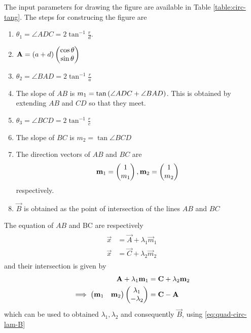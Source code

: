 \documentclass[journal,12pt,twocolumn]{IEEEtran}
\begin{document}
\begin{enumerate}
\begin{figure}
	  \caption{}
	  \label{fig:matrix-10-14.pdf}
	  \end{figure}
	    \solution   The input parameters for drawing the figure are available in Table
\eqref{table:circ-tang}.  The steps for construcing the figure are 
\begin{enumerate}
	\item  $\theta_1 = \angle ADC = 2\tan ^{-1}\frac{r}{d}$. 
	\item $\mathbf{A} = \left(a+ d\right) \begin{pmatrix}\cos \theta \\ \sin \theta\end{pmatrix}$
	\item $\theta_2 = \angle BAD = 2 \tan ^{-1}\frac{r}{a}$
	\item The slope of $AB$ is $m_1 =   \tan\left(\angle ADC + \angle BAD\right)$.  This is obtained by extending $AB$ and $CD$ so that they meet.
	\item $\theta_3 = \angle BCD = 2 \tan^{-1}\frac{r}{c}$
	\item The slope of $BC$ is $m_2 = \tan \angle BCD$
	\item The direction vectors of $AB$ and $BC$ are
		\begin{align}
			\mathbf{m}_1 = \begin{pmatrix}1 \\m_1\end{pmatrix},
			\mathbf{m}_2 = \begin{pmatrix}1 \\m_2\end{pmatrix}
		\end{align}
		respectively.
	\item $\vec{B}$ is obtained as the point of intersection of the lines $AB$ and $BC$
\end{enumerate}
The equation of $AB$ and BC are respectively 
\begin{align}
	\begin{split}
	\vec{x} &= \vec{A} + \lambda_1 \vec{m}_1
\\
		\vec{x} &= \vec{C} + \lambda_2 \vec{m}_2
		\label{eq:quad-circ-lam-B}
	\end{split}
\end{align}
and their intersection is given by 
\begin{align}
	 \mathbf{A} + \lambda_1 \mathbf{m}_1
	&	= \mathbf{C} + \lambda_2 \mathbf{m}_2
	\\
	\implies \begin{pmatrix}\mathbf{m}_1 & \mathbf{m}_2\end{pmatrix}\begin{pmatrix}\lambda_1 \\ -\lambda_2 \end{pmatrix} &= \mathbf{C}-\mathbf{A}
\end{align}
which can be used to obtained $\lambda_1, \lambda_2$ and consequently $\vec{B}$, using 
		\eqref{eq:quad-circ-lam-B}
\begin{table}[ht!]
	
\caption{}
\label{table:circ-tang}	

\end{table}
\end{enumerate}
\end{document}
